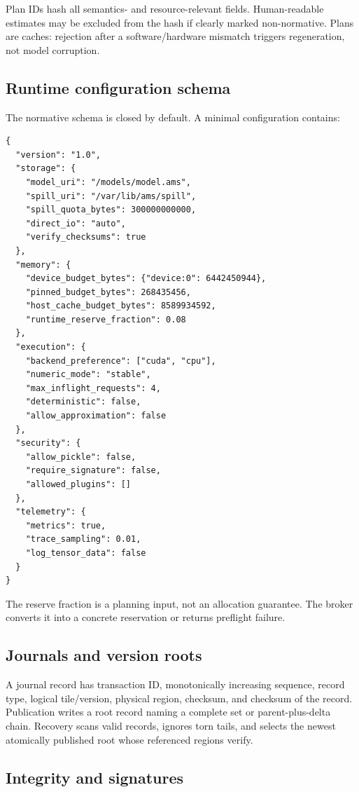Plan IDs hash all semantics- and resource-relevant fields. Human-readable estimates may be excluded from the hash if clearly marked non-normative. Plans are caches: rejection after a software/hardware mismatch triggers regeneration, not model corruption.

\subsection{Runtime configuration schema}

The normative schema is closed by default. A minimal configuration contains:

\begin{lstlisting}[language={},caption={Illustrative runtime configuration.}]
{
  "version": "1.0",
  "storage": {
    "model_uri": "/models/model.ams",
    "spill_uri": "/var/lib/ams/spill",
    "spill_quota_bytes": 300000000000,
    "direct_io": "auto",
    "verify_checksums": true
  },
  "memory": {
    "device_budget_bytes": {"device:0": 6442450944},
    "pinned_budget_bytes": 268435456,
    "host_cache_budget_bytes": 8589934592,
    "runtime_reserve_fraction": 0.08
  },
  "execution": {
    "backend_preference": ["cuda", "cpu"],
    "numeric_mode": "stable",
    "max_inflight_requests": 4,
    "deterministic": false,
    "allow_approximation": false
  },
  "security": {
    "allow_pickle": false,
    "require_signature": false,
    "allowed_plugins": []
  },
  "telemetry": {
    "metrics": true,
    "trace_sampling": 0.01,
    "log_tensor_data": false
  }
}
\end{lstlisting}

The reserve fraction is a planning input, not an allocation guarantee. The broker converts it into a concrete reservation or returns preflight failure.

\subsection{Journals and version roots}

A journal record has transaction ID, monotonically increasing sequence, record type, logical tile/version, physical region, checksum, and checksum of the record. Publication writes a root record naming a complete set or parent-plus-delta chain. Recovery scans valid records, ignores torn tails, and selects the newest atomically published root whose referenced regions verify.

\subsection{Integrity and signatures}

